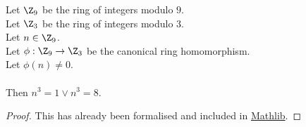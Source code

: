   \begin{lemma}
    \label{lmm:cube_of_castHom_ne_zero}
    \leanok
    Let $\Z_9$ be the ring of integers modulo $9$. \\
    Let $\Z_3$ be the ring of integers modulo $3$. \\
    Let $n \in \Z_9$. \\
    Let $\phi : \Z_9 \to \Z_3$ be the canonical ring homomorphism. \\
    Let $\phi(n) \neq 0$. \\ \\
    Then $n^3=1 \lor n^3=8$.
  \end{lemma}
  \begin{proof}
    \leanok
    This has already been formalised and included in \href{https://pitmonticone.github.io/FLT3/docs/FLT3/Mathlib/NumberTheory/FLT/Three.html#cube_of_castHom_ne_zero}{Mathlib}.
  \end{proof}